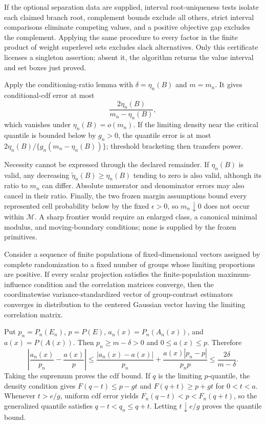 If the optional separation data are supplied, interval root-uniqueness tests isolate each claimed branch root, complement bounds exclude all others, strict interval comparisons eliminate competing values, and a positive objective gap excludes the complement.  Applying the same procedure to every factor in the finite product of weight superlevel sets excludes slack alternatives.  Only this certificate licenses a singleton assertion; absent it, the algorithm returns the value interval and set boxes just proved.

Apply the conditioning-ratio lemma with \(\delta=\eta_n(B)\) and \(m=m_n\).  It gives conditional-cdf error at most
\[
\frac{2\eta_n(B)}{m_n-\eta_n(B)},
\]
which vanishes under \(\eta_n(B)=o(m_n)\).  If the limiting density near the critical quantile is bounded below by \(g_n>0\), the quantile error is at most \(2\eta_n(B)/\{g_n(m_n-\eta_n(B))\}\); threshold bracketing then transfers power.

Necessity cannot be expressed through the declared remainder.  If \(\eta_n(B)\) is valid, any decreasing \(\widetilde\eta_n(B)\ge\eta_n(B)\) tending to zero is also valid, although its ratio to \(m_n\) can differ.  Absolute numerator and denominator errors may also cancel in their ratio.  Finally, the two frozen margin assumptions bound every represented cell probability below by the fixed \(\epsilon>0\), so \(m_n\downarrow0\) does not occur within \(\mathcal M\).  A sharp frontier would require an enlarged class, a canonical minimal modulus, and moving-boundary conditions; none is supplied by the frozen primitives.

Consider a sequence of finite populations of fixed-dimensional vectors assigned by complete randomization to a fixed number of groups whose limiting proportions are positive. If every scalar projection satisfies the finite-population maximum-influence condition and the correlation matrices converge, then the coordinatewise variance-standardized vector of group-contrast estimators converges in distribution to the centered Gaussian vector having the limiting correlation matrix.

Put \(p_n=P_n(E_n)\), \(p=P(E)\), \(a_n(x)=P_n(A_n(x))\), and \(a(x)=P(A(x))\).  Then \(p_n\ge m-\delta>0\) and \(0\le a(x)\le p\).  Therefore
\[
\left|\frac{a_n(x)}{p_n}-\frac{a(x)}p\right|
\le\frac{|a_n(x)-a(x)|}{p_n}
+\frac{a(x)|p_n-p|}{p_np}
\le\frac{2\delta}{m-\delta}.
\]
Taking the supremum proves the cdf bound.  If \(q\) is the limiting \(p\)-quantile, the density condition gives \(F(q-t)\le p-gt\) and \(F(q+t)\ge p+gt\) for \(0<t<a\).  Whenever \(t>e/g\), uniform cdf error yields \(F_n(q-t)<p<F_n(q+t)\), so the generalized quantile satisfies \(q-t<q_n\le q+t\).  Letting \(t\downarrow e/g\) proves the quantile bound.

